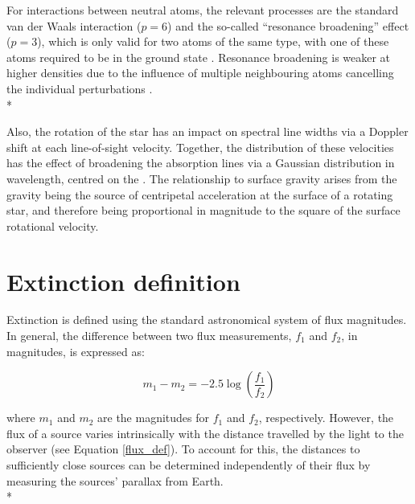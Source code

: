 \documentclass[12pt, a4paper]{report}
\begin{document}
For interactions between neutral atoms, the relevant processes are the standard van der Waals interaction ($p = 6$) and the so-called ``resonance broadening'' effect ($p = 3$), which is only valid for two atoms of the same type, with one of these atoms required to be in the ground state \citep{1969A&A.....3..462L}. Resonance broadening is weaker at higher densities due to the influence of multiple neighbouring atoms cancelling the individual perturbations \citep{10.2307/96756}. \\*



Also, the rotation of the star has an impact on spectral line widths via a Doppler shift at each line-of-sight velocity. Together, the distribution of these velocities has the effect of broadening the absorption lines via a Gaussian distribution in wavelength, centred on the  \citep{1995ApJ...439..860C}. The relationship to surface gravity arises from the gravity being the source of centripetal acceleration at the surface of a rotating star, and therefore being proportional in magnitude to the square of the surface rotational velocity.

\section{Extinction definition} \label{extinc_desc}
Extinction is defined using the standard astronomical system of flux magnitudes. In general, the difference between two flux measurements, $f_{1}$ and $f_{2}$, in magnitudes, is expressed as:

\begin{equation}
\label{mags_def}
m_{1} - m_{2} = -2.5\log \left( \frac{f_{1}}{f_{2}} \right)
\end{equation}

where $m_{1}$ and $m_{2}$ are the magnitudes for $f_{1}$ and $f_{2}$, respectively. However, the flux of a source varies intrinsically with the distance travelled by the light to the observer (see Equation \ref{flux_def}). To account for this, the distances to sufficiently close sources can be determined independently of their flux by measuring the sources' parallax from Earth. \\*
\end{document}
